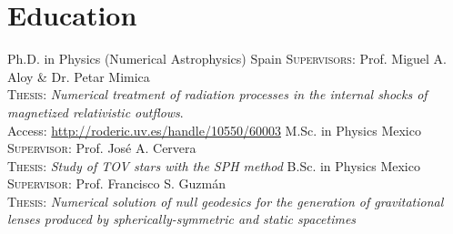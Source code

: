 \section{Education}

%
{\UVval}%
{Ph.D. in Physics (Numerical Astrophysics)}%
{}%
{Spain}%
{%
  \textsc{Supervisors}: Prof. Miguel A. Aloy \& Dr. Petar Mimica\\
  \textsc{Thesis}: \textit{Numerical treatment of radiation processes in the internal shocks of magnetized relativistic outflows}.\\
  Access: \url{http://roderic.uv.es/handle/10550/60003}%
}
%
%
{\UMSNHes}%
{M.Sc. in Physics}%
{}%
{Mexico}%
{%
  \textsc{Supervisor}: Prof. José A. Cervera\\
  \textsc{Thesis}: \textit{Study of TOV stars with the SPH method}%
}
%
%
{\UAEMes}{B.Sc. in Physics}%
{}%
{Mexico}%
{%
  \textsc{Supervisor}: Prof. Francisco S. Guzmán\\
  \textsc{Thesis}: \textit{Numerical solution of null geodesics for the generation of gravitational lenses produced by spherically-symmetric and static spacetimes}%
}
